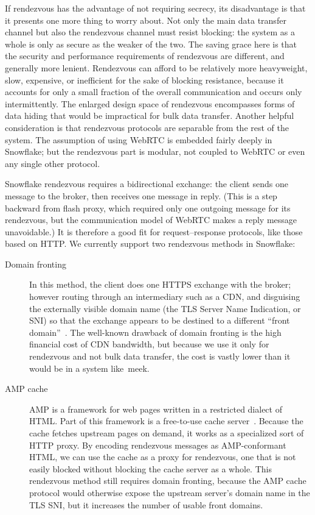 \documentclass[letterpaper,twocolumn]{article}
\begin{document}
If rendezvous has the advantage of not requiring secrecy,
its disadvantage is that it presents one more thing to worry about.
Not only the main data transfer channel
but also the rendezvous channel must resist blocking:
the system as a whole is only as secure as the weaker of the two.
The saving grace here is that the security and performance requirements
of rendezvous are different, and generally more lenient.
Rendezvous can afford to be relatively more heavyweight,
slow, expensive, or inefficient for the sake of blocking resistance,
because it accounts for only a small fraction of the overall communication
and occurs only intermittently.
The enlarged design space of rendezvous encompasses
forms of data hiding that would be impractical
for bulk data transfer.
Another helpful consideration is that rendezvous protocols
are separable from the rest of the system.
The assumption of using WebRTC is embedded fairly deeply in Snowflake;
but the rendezvous part is modular,
not coupled to WebRTC or even any single other protocol.

Snowflake rendezvous requires a bidirectional exchange:
the client sends one message to the broker, then receives
one message in reply.
(This is a step backward from flash proxy,
which required only one outgoing message for its rendezvous,
but the communication model of WebRTC makes a reply message unavoidable.)
It is therefore a good fit for request--response protocols,
like those based on HTTP.
We currently support two rendezvous methods in Snowflake:

\begin{description}
\item[Domain fronting]
In this method, the client does one HTTPS exchange
with the broker; however routing through an intermediary such as a CDN,
and disguising the externally visible domain name
(the TLS Server Name Indication, or SNI) so that the exchange
appears to be destined to a different ``front domain''~\cite{Fifield2015a}.
The well-known drawback of domain fronting
is the high financial cost of CDN bandwidth,
but because we use it only for rendezvous and not bulk data transfer,
the cost is vastly lower than it would be in a system like~meek.

\item[AMP cache]
AMP is a framework for web pages written in a restricted dialect of HTML.
Part of this framework is a free-to-use
cache server~\cite{amp-cache}.
Because the cache fetches upstream pages on demand,
it works as a specialized sort of HTTP proxy.
By encoding rendezvous messages as AMP-conformant HTML,
we can use the cache as a proxy for rendezvous,
one that is not easily blocked without blocking the cache server as a whole.
This rendezvous method still requires domain fronting,
because the AMP cache protocol would otherwise expose the
upstream server's domain name in the TLS SNI,
but it increases the number of usable front domains.
\end{description}
\end{document}
